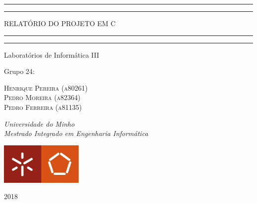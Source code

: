 \documentclass[a4paper, 11pt, oneside]{article}
\begin{document}
 

\begin{titlepage}


	\centering 
	
	\scshape
	
	\vspace*{\baselineskip}
	
	
	\rule{\textwidth}{1.6pt}\vspace*{-\baselineskip}\vspace*{2pt}
	\rule{\textwidth}{0.4pt}
	
	\vspace{0.75\baselineskip}
	
	{\LARGE RELATÓRIO DO PROJETO EM C} 
	
	\vspace{0.75\baselineskip} 
	
	\rule{\textwidth}{0.4pt}\vspace*{-\baselineskip}\vspace{3.2pt}
	\rule{\textwidth}{1.6pt}
	
	\vspace{2\baselineskip}
	
	Laboratórios de Informática III
	
	\vspace*{3\baselineskip}
	
	Grupo 24:
	
	\vspace{0.5\baselineskip}
	
	{\scshape\Large Henrique Pereira (a80261) \\ Pedro Moreira (a82364) \\ Pedro Ferreira (a81135) \\}
	
	\vspace{0.5\baselineskip}
	
	\textit{Universidade do Minho \\ Mestrado Integrado em Engenharia Informática}
	
	\vfill

	\includegraphics[width=40mm]{logoUM.jpg}

	\vspace{0.3\baselineskip}
	
	2018

\end{titlepage}
\end{document}
